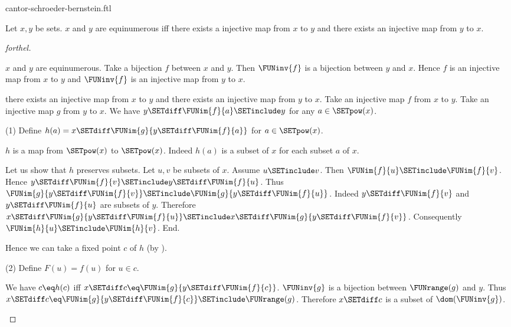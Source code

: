 \documentclass{naproche-library}
\begin{document}
\begin{smodule}[title=The Cantor-Schröder-Bernstein Theorem]{cantor-schroeder-bernstein.ftl}

\begin{theorem}[forthel,title=Cantor-Schröder-Bernstein,id=cantor_schroeder_bernstein]
  Let $x,y$ be sets.
  $x$ and $y$ are equinumerous iff there exists a injective map from $x$ to $y$ and there exists an injective map from $y$ to $x$.
\end{theorem}
\begin{proof}[forthel]
  \begin{case}{$x$ and $y$ are equinumerous.}
    Take a bijection $f$ between $x$ and $y$.
    Then $\FUNinv{f}$ is a bijection between $y$ and $x$.
    Hence $f$ is an injective map from $x$ to $y$ and $\FUNinv{f}$ is an
    injective map from $y$ to $x$.
  \end{case}

  \begin{case}{there exists an injective map from $x$ to $y$ and there exists an injective map from $y$ to $x$.}
    Take an injective map $f$ from $x$ to $y$.
    Take an injective map $g$ from $y$ to $x$.
    We have $y \SETdiff \FUNim{f}{a} \SETinclude y$ for any $a \in \SETpow(x)$.

    (1) Define $h(a) = x \SETdiff \FUNim{g}{y \SETdiff \FUNim{f}{a}}$ for $a \in \SETpow(x)$.

    $h$ is a map from $\SETpow(x)$ to $\SETpow(x)$.
    Indeed $h(a)$ is a subset of $x$ for each subset $a$ of $x$.

    Let us show that $h$ preserves subsets.
      Let $u, v$ be subsets of $x$.
      Assume $u \SETinclude v$.
      Then $\FUNim{f}{u} \SETinclude \FUNim{f}{v}$.
      Hence $y \SETdiff \FUNim{f}{v} \SETinclude y \SETdiff \FUNim{f}{u}$.
      Thus $\FUNim{g}{y \SETdiff \FUNim{f}{v}} \SETinclude \FUNim{g}{y \SETdiff \FUNim{f}{u}}$.
      Indeed $y \SETdiff \FUNim{f}{v}$ and $y \SETdiff \FUNim{f}{u}$ are subsets of $y$.
      Therefore $x \SETdiff \FUNim{g}{y \SETdiff \FUNim{f}{u}} \SETinclude x \SETdiff \FUNim{g}{y \SETdiff \FUNim{f}{v}}$.
      Consequently $\FUNim{h}{u} \SETinclude \FUNim{h}{v}$.
    End.

    Hence we can take a fixed point $c$ of $h$ (by ).

    (2) Define $F(u) = f(u)$ for $u \in c$.

    We have $c \eq h(c)$ iff $x \SETdiff c \eq \FUNim{g}{y \SETdiff \FUNim{f}{c}}$.
    $\FUNinv{g}$ is a bijection between $\FUNrange(g)$ and $y$.
    Thus $x \SETdiff c \eq \FUNim{g}{y \SETdiff \FUNim{f}{c}} \SETinclude \FUNrange(g)$.
    Therefore $x \SETdiff c$ is a subset of $\dom(\FUNinv{g})$.


\end{case}
\end{proof}
\end{smodule}
\end{document}
